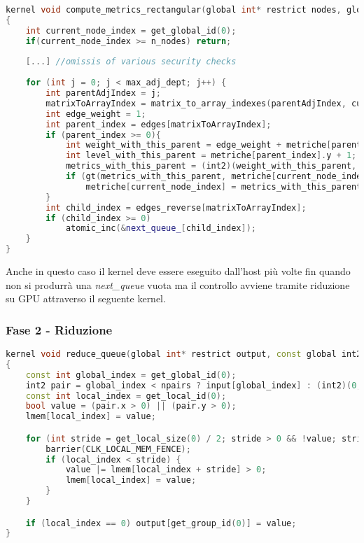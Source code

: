 \documentclass[../relazione.tex]{subfiles}
\begin{document}
\begin{lstlisting}[language=C++, caption={Compute metrics kernel II},captionpos=b]
kernel void compute_metrics_rectangular(global int* restrict nodes, global int* queue_, global int* next_queue_, const int n_nodes, global edge_t* restrict edges, global edge_t* restrict edges_reverse, volatile global int2* metriche, const int max_adj_dept)
{
	int current_node_index = get_global_id(0);
	if(current_node_index >= n_nodes) return;
	
	[...] //omissis of various security checks
	
	for (int j = 0; j < max_adj_dept; j++) {
		int parentAdjIndex = j;
		matrixToArrayIndex = matrix_to_array_indexes(parentAdjIndex, current_node_index, n_nodes);
		int edge_weight = 1;
		int parent_index = edges[matrixToArrayIndex];
		if (parent_index >= 0){
			int weight_with_this_parent = edge_weight + metriche[parent_index].x + nodes[current_node_index];
			int level_with_this_parent = metriche[parent_index].y + 1;
			metrics_with_this_parent = (int2)(weight_with_this_parent, level_with_this_parent);
			if (gt(metrics_with_this_parent, metriche[current_node_index]))
				metriche[current_node_index] = metrics_with_this_parent;
		}
		int child_index = edges_reverse[matrixToArrayIndex];
		if (child_index >= 0)
			atomic_inc(&next_queue_[child_index]);
	}
}
\end{lstlisting}

Anche in questo caso il kernel deve essere eseguito dall'host più volte fin quando non si produrrà una \textit{next\_queue} vuota ma il controllo avviene tramite riduzione su GPU attraverso il seguente kernel.

\subsubsection{Fase 2 - Riduzione}

\begin{lstlisting}[language=C++, caption={Reduce queue kernel},captionpos=b]
kernel void reduce_queue(global int* restrict output, const global int2* restrict input, local int* restrict lmem, int npairs)
{
	const int global_index = get_global_id(0);
	int2 pair = global_index < npairs ? input[global_index] : (int2)(0, 0);
	const int local_index = get_local_id(0);
	bool value = (pair.x > 0) || (pair.y > 0);
	lmem[local_index] = value;

	for (int stride = get_local_size(0) / 2; stride > 0 && !value; stride /= 2) {
		barrier(CLK_LOCAL_MEM_FENCE);
		if (local_index < stride) {
			value |= lmem[local_index + stride] > 0;
			lmem[local_index] = value;
		}
	}

	if (local_index == 0) output[get_group_id(0)] = value;
}
\end{lstlisting}
\end{document}
